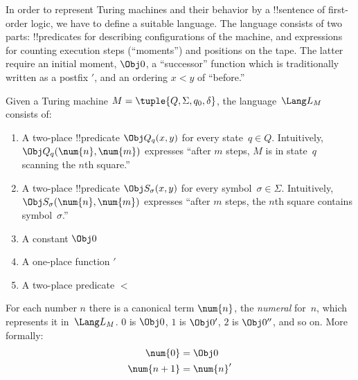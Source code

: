 \documentclass[../../../include/open-logic-section]{subfiles}
\begin{document}

\begin{explain}
In order to represent Turing machines and their behavior by a !!{sentence}
of first-order logic, we have to define a suitable language. The
language consists of two parts: !!{predicate}s for describing
configurations of the machine, and expressions for counting execution
steps (``moments'') and positions on the tape. The latter require an
initial moment, $\Obj 0$, a ``successor'' function which is
traditionally written as a postfix $\prime$, and an ordering $x
< y$ of ``before.''
\end{explain}

\begin{defn}
Given a Turing machine $M = \tuple{Q, \Sigma, q_0, \delta}$, the
language~$\Lang L_M$ consists of:
\begin{enumerate}
\item A two-place !!{predicate} $\Obj Q_q(x, y)$ for every state~$q \in
  Q$.  Intuitively, $\Obj Q_q(\num{n}, \num{m})$ expresses ``after $m$
  steps, $M$ is in state~$q$ scanning the $n$th square.''
\item A two-place !!{predicate} $\Obj S_\sigma(x, y)$ for every
  symbol~$\sigma\in \Sigma$.  Intuitively, $\Obj S_\sigma(\num{n},
  \num{m})$ expresses ``after $m$ steps, the $n$th square contains
  symbol~$\sigma$.''
\item A constant $\Obj 0$
\item A one-place function $\prime$
\item A two-place predicate $<$
\end{enumerate}
\end{defn}

For each number $n$ there is a canonical term $\num{n}$, the
\emph{numeral} for~$n$, which represents it in~$\Lang L_M$. $\num{0}$
is $\Obj 0$, $\num{1}$ is $\Obj 0'$, $\num{2}$ is $\Obj 0''$, and so
on. More formally:
\begin{align*}
\num{0} & = \Obj 0 \\
\num{n+1} &= \num{n}'
\end{align*}
\end{document}
